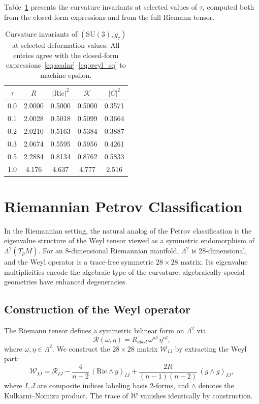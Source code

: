 \documentclass[12pt]{article}
\theoremstyle{definition}
\theoremstyle{remark}
\begin{document}
Table~\ref{tab:invariants} presents the curvature invariants at selected values of $\tau$, computed both from the closed-form expressions and from the full Riemann tensor.

\begin{table}[h]
\centering
\begin{tabular}{@{}ccccc@{}}
\toprule
$\tau$ & $R$ & $|\mathrm{Ric}|^2$ & $\mathcal{K}$ & $|C|^2$ \\
\midrule
0.0 & 2.0000 & 0.5000 & 0.5000 & 0.3571 \\
0.1 & 2.0028 & 0.5018 & 0.5099 & 0.3664 \\
0.2 & 2.0210 & 0.5163 & 0.5384 & 0.3887 \\
0.3 & 2.0674 & 0.5595 & 0.5956 & 0.4261 \\
0.5 & 2.2884 & 0.8134 & 0.8762 & 0.5833 \\
1.0 & 4.176 & 4.637 & 4.777 & 2.516 \\
\bottomrule
\end{tabular}
\caption{Curvature invariants of $(\mathrm{SU}(3),g_\tau)$ at selected deformation values.  All entries agree with the closed-form expressions~\eqref{eq:scalar}--\eqref{eq:weyl_sq} to machine epsilon.}
\label{tab:invariants}
\end{table}

\section{Riemannian Petrov Classification}
\label{sec:riemannian}

In the Riemannian setting, the natural analog of the Petrov classification is the eigenvalue structure of the Weyl tensor viewed as a symmetric endomorphism of $\Lambda^2(T_pM)$.  For an 8-dimensional Riemannian manifold, $\Lambda^2$ is 28-dimensional, and the Weyl operator is a trace-free symmetric $28\times28$ matrix.  Its eigenvalue multiplicities encode the algebraic type of the curvature: algebraically special geometries have enhanced degeneracies.

\subsection{Construction of the Weyl operator}

The Riemann tensor defines a symmetric bilinear form on $\Lambda^2$ via
\begin{equation}
\label{eq:weyl_operator}
\mathcal{R}(\omega,\eta) = R_{abcd}\,\omega^{ab}\,\eta^{cd},
\end{equation}
where $\omega,\eta\in\Lambda^2$.  We construct the $28\times28$ matrix $\mathcal{W}_{IJ}$ by extracting the Weyl part:
\begin{equation}
\mathcal{W}_{IJ} = \mathcal{R}_{IJ} - \frac{4}{n-2}\,(\mathrm{Ric}\wedge g)_{IJ} + \frac{2R}{(n-1)(n-2)}\,(g\wedge g)_{IJ},
\end{equation}
where $I,J$ are composite indices labeling basis 2-forms, and $\wedge$ denotes the Kulkarni--Nomizu product.  The trace of $\mathcal{W}$ vanishes identically by construction.
\end{document}
